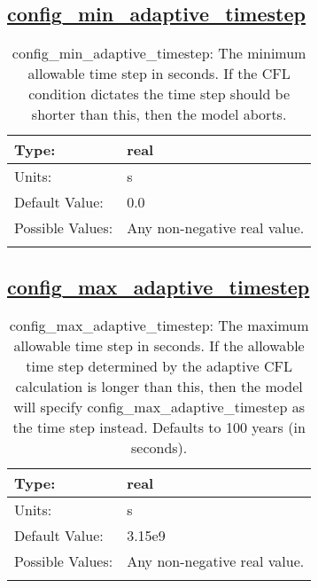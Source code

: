 \subsection[config\_min\_adaptive\_timestep]{\hyperref[sec:nm_tab_time_integration]{config\_min\_adaptive\_timestep}}
\label{subsec:nm_sec_config_min_adaptive_timestep}
\begin{center}
\begin{longtable}{| p{2.0in} || p{4.0in} |}
    \hline
    Type: & real \\
    \hline
    Units: & \si{s} \\
    \hline
    Default Value: & 0.0 \\
    \hline
    Possible Values: & Any non-negative real value. \\
    \hline
    \caption{config\_min\_adaptive\_timestep: The minimum allowable time step in seconds.  If the CFL condition dictates the time step should be shorter than this, then the model aborts.}
\end{longtable}
\end{center}
\subsection[config\_max\_adaptive\_timestep]{\hyperref[sec:nm_tab_time_integration]{config\_max\_adaptive\_timestep}}
\label{subsec:nm_sec_config_max_adaptive_timestep}
\begin{center}
\begin{longtable}{| p{2.0in} || p{4.0in} |}
    \hline
    Type: & real \\
    \hline
    Units: & \si{s} \\
    \hline
    Default Value: & 3.15e9 \\
    \hline
    Possible Values: & Any non-negative real value. \\
    \hline
    \caption{config\_max\_adaptive\_timestep: The maximum allowable time step in seconds. If the allowable time step determined by the adaptive CFL calculation is longer than this, then the model will specify config\_max\_adaptive\_timestep as the time step instead. Defaults to 100 years (in seconds).}
\end{longtable}
\end{center}
